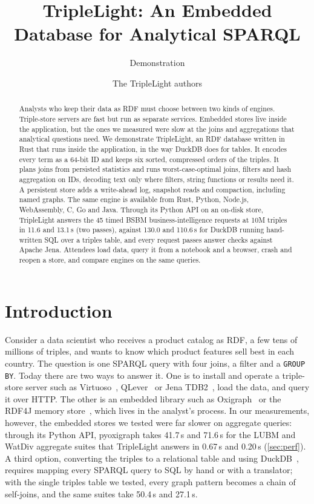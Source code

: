 \documentclass[sigconf,nonacm]{acmart}
\newcommand{\sys}{TripleLight}
\begin{document}
\title{\sys{}: An Embedded Database for Analytical SPARQL}
\subtitle{Demonstration}
\author{The \sys{} authors}

\begin{abstract}
Analysts who keep their data as RDF must choose between two kinds of engines. Triple-store servers are fast but
run as separate services. Embedded stores live inside the application, but the ones we measured were slow at the joins and
aggregations that analytical questions need. We demonstrate \sys{}, an RDF database written in Rust that runs inside the
application, in the way DuckDB does for tables. It encodes every term as a 64-bit ID and keeps six sorted, compressed
orders of the triples. It plans joins from persisted statistics and runs worst-case-optimal joins, filters and hash
aggregation on IDs, decoding text only where filters, string functions or results need it. A persistent store adds a write-ahead log, snapshot reads
and compaction, including named graphs. The same engine is available from Rust, Python, Node.js, WebAssembly, C, Go
and Java. Through its Python API on an on-disk store, \sys{} answers the 45 timed BSBM business-intelligence requests
at 10M triples in 11.6 and 13.1\,s (two passes), against 130.0 and 110.6\,s for DuckDB running hand-written SQL over
a triples table, and every request passes answer checks against Apache Jena. Attendees load data, query it from a notebook and a browser, crash and reopen a store, and compare
engines on the same queries.
\end{abstract}

\maketitle

\section{Introduction}

Consider a data scientist who receives a product catalog as RDF, a few tens of millions of triples, and wants to know
which product features sell best in each country. The question is one SPARQL query with four joins, a filter and a
\texttt{GROUP BY}. Today there are two ways to answer it. One is to install and operate a triple-store server such as
Virtuoso~\cite{virtuoso}, QLever~\cite{qlever} or Jena TDB2~\cite{jena}, load the data, and query it over HTTP. The
other is an embedded library such as Oxigraph~\cite{oxigraph} or the RDF4J memory store~\cite{rdf4j}, which lives in
the analyst's process. In our measurements, however, the embedded stores we tested were far slower on aggregate
queries: through its Python API, pyoxigraph takes 41.7\,s and 71.6\,s for the LUBM and WatDiv aggregate suites that
\sys{} answers in 0.67\,s and 0.20\,s (\cref{sec:perf}). A third option, converting the triples to a relational table
and using DuckDB~\cite{duckdb}, requires mapping every SPARQL query to SQL by hand or with a translator; with the
single triples table we tested, every
graph pattern becomes a chain of self-joins, and the same suites take 50.4\,s and 27.1\,s.
\end{document}
